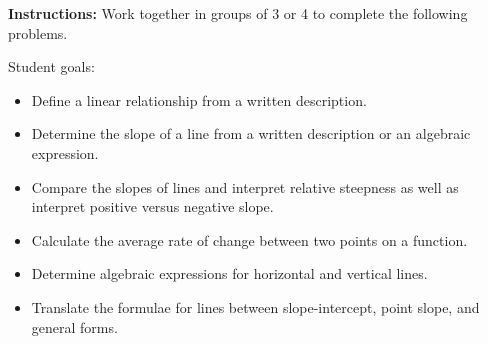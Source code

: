 



\noindent \textbf{Instructions:}  Work together in groups of  3 or 4 to complete the following problems.

\noindent
Student goals:
\begin{itemize}
\item Define a linear relationship from a written description.
\item Determine the slope of a line from a written description or an algebraic expression.
\item Compare the slopes of lines and interpret relative steepness as well as interpret positive versus negative slope.
\item Calculate the average rate of change between two points on a function.
\item Determine algebraic expressions for horizontal and vertical lines.
\item Translate the formulae for lines between slope-intercept,
  point slope, and general forms.
\end{itemize}



